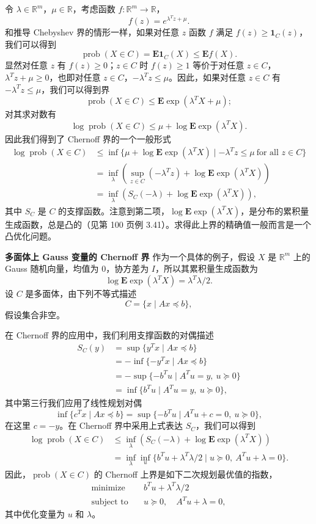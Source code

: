 \documentclass[UTF8, 12pt, fontset=fandol, oneside]{ctexart}
\begin{document}
令 $\lambda\in\mathbb{R}^m$，$\mu\in\mathbb{R}$，考虑函数 $f:\mathbb{R}^m\to\mathbb{R}$，
\[
f(z)=e^{\lambda^Tz+\mu}.
\]
和推导 Chebyshev 界的情形一样，如果对任意 $z$ 函数 $f$ 满足 $f(z)\geq\mathbf{1}_C(z)$，我们可以得到
\[
\operatorname{prob}(X\in C)=\mathbf{E}\mathbf{1}_C(X)\leq \mathbf{E}f(X).
\]
显然对任意 $z$ 有 $f(z)\geq 0$；$z\in C$ 时 $f(z)\geq 1$ 等价于对任意 $z\in C$，$\lambda^Tz+\mu\geq 0$，也即对任意 $z\in C$，$-\lambda^Tz\leq \mu$。因此，如果对任意 $z\in C$ 有 $-\lambda^Tz\leq \mu$，我们可以得到界
\[
\operatorname{prob}(X\in C)\leq \mathbf{E}\exp(\lambda^TX+\mu);
\]
对其求对数有
\[
\log\operatorname{prob}(X\in C)\leq \mu+\log\mathbf{E}\exp(\lambda^TX).
\]
因此我们得到了 Chernoff 界的一个一般形式
\[
\begin{aligned}
\log\operatorname{prob}(X\in C)
&\leq \inf\{\mu+\log\mathbf{E}\exp(\lambda^TX)\mid -\lambda^Tz\leq\mu\ \text{for all }z\in C\}\\
&=\inf_\lambda\left(\sup_{z\in C}(-\lambda^Tz)+\log\mathbf{E}\exp(\lambda^TX)\right)\\
&=\inf_\lambda\left(S_C(-\lambda)+\log\mathbf{E}\exp(\lambda^TX)\right),
\end{aligned}
\]
其中 $S_C$ 是 $C$ 的支撑函数。注意到第二项，$\log\mathbf{E}\exp(\lambda^TX)$，是分布的累积量生成函数，总是凸的（见第 100 页例 3.41）。求得此上界的精确值一般而言是一个凸优化问题。

\noindent\textbf{多面体上 Gauss 变量的 Chernoff 界}\quad
作为一个具体的例子，假设 $X$ 是 $\mathbb{R}^m$ 上的 Gauss 随机向量，均值为 $0$，协方差为 $I$，所以其累积量生成函数为
\[
\log\mathbf{E}\exp(\lambda^TX)=\lambda^T\lambda/2.
\]
设 $C$ 是多面体，由下列不等式描述
\[
C=\{x\mid Ax\preceq b\},
\]
假设集合非空。

在 Chernoff 界的应用中，我们利用支撑函数的对偶描述
\[
\begin{aligned}
S_C(y)&=\sup\{y^Tx\mid Ax\preceq b\}\\
&=-\inf\{-y^Tx\mid Ax\preceq b\}\\
&=-\sup\{-b^Tu\mid A^Tu=y,\ u\succeq 0\}\\
&=\inf\{b^Tu\mid A^Tu=y,\ u\succeq 0\},
\end{aligned}
\]
其中第三行我们应用了线性规划对偶
\[
\inf\{c^Tx\mid Ax\preceq b\}=\sup\{-b^Tu\mid A^Tu+c=0,\ u\succeq 0\},
\]
在这里 $c=-y$。在 Chernoff 界中采用上式表达 $S_C$，我们可以得到
\[
\begin{aligned}
\log\operatorname{prob}(X\in C)
&\leq \inf_\lambda\left(S_C(-\lambda)+\log\mathbf{E}\exp(\lambda^TX)\right)\\
&=\inf_\lambda\inf_u\{b^Tu+\lambda^T\lambda/2\mid u\succeq 0,\ A^Tu+\lambda=0\}.
\end{aligned}
\]
因此，$\operatorname{prob}(X\in C)$ 的 Chernoff 上界是如下二次规划最优值的指数，
\begin{equation}
\begin{aligned}
\text{minimize}\quad & b^Tu+\lambda^T\lambda/2\\
\text{subject to}\quad & u\succeq 0,\quad A^Tu+\lambda=0,
\end{aligned}
\tag{7.21}
\end{equation}
其中优化变量为 $u$ 和 $\lambda$。
\end{document}
